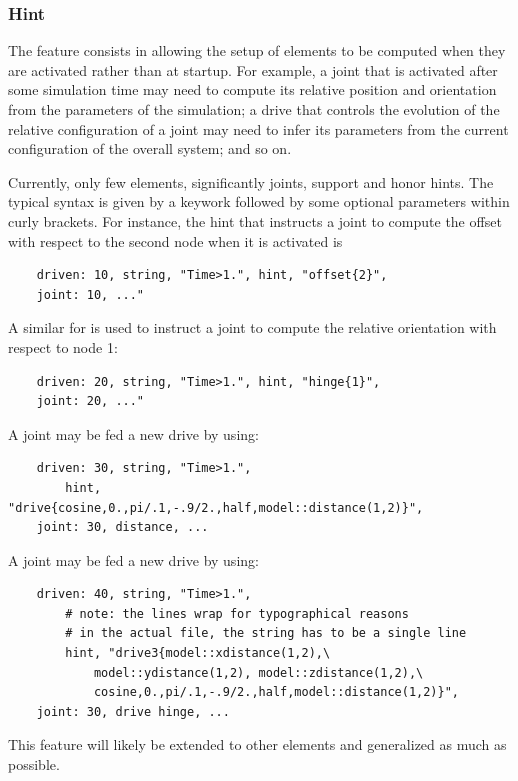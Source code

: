 \subsubsection{Hint}
The  feature consists in allowing the setup of elements
to be computed when they are activated rather than at startup.
For example, a joint that is activated after some simulation time
may need to compute its relative position and orientation
from the parameters of the simulation; a drive that controls
the evolution of the relative configuration of a joint may need
to infer its parameters from the current configuration
of the overall system; and so on.

Currently, only few elements, significantly joints, support 
and honor hints.
The typical syntax is given by a keywork followed by some optional
parameters within curly brackets.
For instance, the hint that instructs a joint to compute the offset
with respect to the second node when it is activated is
\begin{verbatim}
    driven: 10, string, "Time>1.", hint, "offset{2}",
    joint: 10, ..."
\end{verbatim}
A similar for is used to instruct a joint to compute the relative
orientation with respect to node 1:
\begin{verbatim}
    driven: 20, string, "Time>1.", hint, "hinge{1}",
    joint: 20, ..."
\end{verbatim}
A  joint may be fed a new drive by using:
\begin{verbatim}
    driven: 30, string, "Time>1.",
        hint, "drive{cosine,0.,pi/.1,-.9/2.,half,model::distance(1,2)}",
    joint: 30, distance, ... 
\end{verbatim}
A  joint may be fed a new drive by using:
\begin{verbatim}
    driven: 40, string, "Time>1.",
        # note: the lines wrap for typographical reasons
        # in the actual file, the string has to be a single line
        hint, "drive3{model::xdistance(1,2),\
            model::ydistance(1,2), model::zdistance(1,2),\
            cosine,0.,pi/.1,-.9/2.,half,model::distance(1,2)}",
    joint: 30, drive hinge, ... 
\end{verbatim}

This feature will likely be extended to other elements
and generalized as much as possible.


